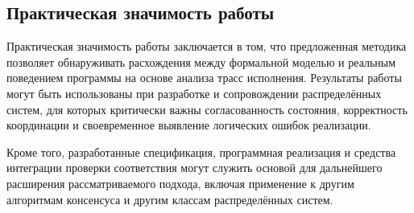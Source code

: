 \subsection*{Практическая значимость работы}

Практическая значимость работы заключается в том, что предложенная
методика позволяет обнаруживать расхождения между формальной моделью
и реальным поведением программы на основе анализа трасс исполнения.
Результаты работы могут быть использованы при разработке и
сопровождении распределённых систем, для которых критически важны
согласованность состояния, корректность координации и своевременное
выявление логических ошибок реализации.

Кроме того, разработанные спецификация, программная реализация и
средства интеграции проверки соответствия могут служить основой для
дальнейшего расширения рассматриваемого подхода, включая применение к
другим алгоритмам консенсуса и другим классам распределённых систем.
